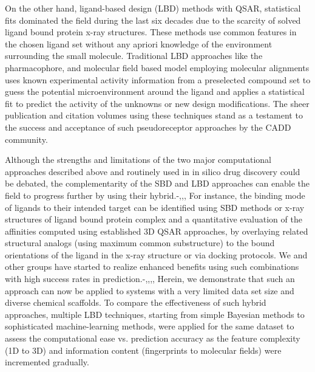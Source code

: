 On the other hand, ligand-based design (LBD) methods with QSAR, statistical fits dominated the field during the last six decades due to the scarcity of solved ligand bound protein x-ray structures.  These methods use common features in the chosen ligand set without any apriori knowledge of the environment surrounding the small molecule.  Traditional LBD approaches like the pharmacophore, and molecular field based model employing molecular alignments uses known experimental activity information from a preselected compound set to guess the potential microenvironment around the ligand and applies a statistical fit to predict the activity of the unknowns or new design modifications.  The sheer publication and citation volumes using these techniques stand as a testament to the success and acceptance of such pseudoreceptor approaches by the CADD community.  

Although the strengths and limitations of the two major computational approaches described above and routinely used in in silico drug discovery could be debated, the complementarity of the SBD and LBD approaches can enable the field to progress further by using their hybrid.-,,,  For instance, the binding mode of ligands to their intended target can be identified using SBD methods or x-ray structures of ligand bound protein complex and a quantitative evaluation of the affinities computed using established 3D QSAR approaches, by overlaying related structural analogs (using maximum common substructure) to the bound orientations of the ligand in the x-ray structure or via docking protocols.  We and other groups have started to realize enhanced benefits using such combinations with high success rates in prediction.-,,,,  Herein, we demonstrate that such an approach can now be applied to systems with a very limited data set size and diverse chemical scaffolds.   To compare the effectiveness of such hybrid approaches, multiple LBD techniques, starting from simple Bayesian methods to sophisticated machine-learning methods, were applied for the same dataset to assess the computational ease vs. prediction accuracy as the feature complexity (1D to 3D) and information content (fingerprints to molecular fields) were incremented gradually.

